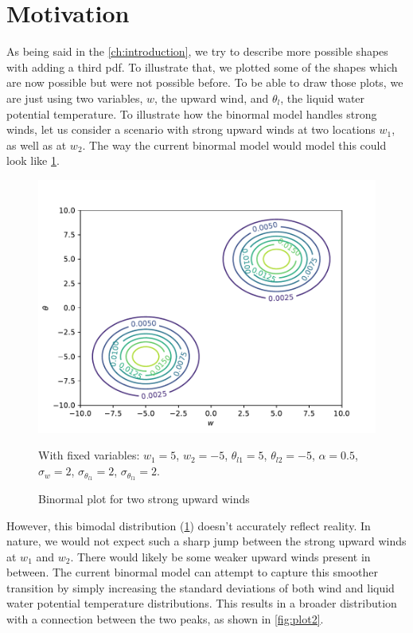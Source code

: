 \section{Motivation}\label{sec:motivation}

As being said in the \cref{ch:introduction},
we try to describe more possible shapes with adding a third \gls{pdf}.
To illustrate that, we plotted some of the shapes which are now possible but were not possible before.
To be able to draw those plots, we are just using two variables, $w$, the upward wind,
and $\theta_l$, the liquid water potential temperature.
To illustrate how the binormal model handles strong winds,
let us consider a scenario with strong upward winds at two locations $w_1$, as well as at $w_2$.
The way the current binormal model would model this could look like \cref{fig:plot1}.

\begin{figure}[!htb]
    \centering
    \includegraphics[width=.5\textwidth]{include/figures/plot1}
    \caption{Binormal plot for two strong upward winds}
    \label{fig:plot1}
    With fixed variables: $w_1 = 5$, $w_2 = -5$, $\theta_{l1} = 5$, $\theta_{l2} = -5$,
    $\alpha = 0.5$, $\sigma_w = 2$, $\sigma_{\theta_{l1}} = 2$, $\sigma_{\theta_{l1}} = 2$.
\end{figure}

However, this bimodal distribution (\cref{fig:plot1}) doesn't accurately reflect reality.
In nature, we would not expect such a sharp jump between the strong upward winds at $w_1$ and $w_2$.
There would likely be some weaker upward winds present in between.
The current binormal model can attempt to capture this smoother transition
by simply increasing the standard deviations of both wind
and liquid water potential temperature distributions.
This results in a broader distribution with a connection between the two peaks,
as shown in \cref{fig:plot2}.

